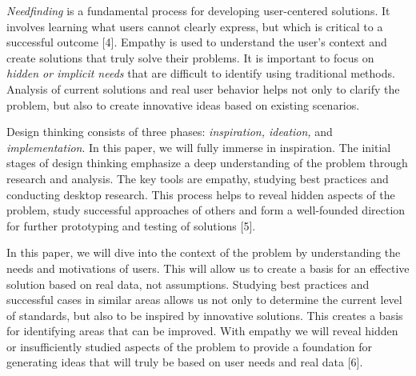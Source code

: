 \emph{Needfinding} is a fundamental process for developing user-centered
solutions. It involves learning what users cannot clearly express, but
which is critical to a successful outcome {[}4{]}. Empathy is used to
understand the user's context and create solutions that truly solve
their problems. It is important to focus on \emph{hidden or implicit
needs} that are difficult to identify using traditional methods.
Analysis of current solutions and real user behavior helps not only to
clarify the problem, but also to create innovative ideas based on
existing scenarios.

Design thinking consists of three phases: \emph{inspiration, ideation,}
and \emph{implementation}. In this paper, we will fully immerse in
inspiration. The initial stages of design thinking emphasize a deep
understanding of the problem through research and analysis. The key
tools are empathy, studying best practices and conducting desktop
research. This process helps to reveal hidden aspects of the problem,
study successful approaches of others and form a well-founded direction
for further prototyping and testing of solutions {[}5{]}.

In this paper, we will dive into the context of the problem by
understanding the needs and motivations of users. This will allow us to
create a basis for an effective solution based on real data, not
assumptions. Studying best practices and successful cases in similar
areas allows us not only to determine the current level of standards,
but also to be inspired by innovative solutions. This creates a basis
for identifying areas that can be improved. With empathy we will reveal
hidden or insufficiently studied aspects of the problem to provide a
foundation for generating ideas that will truly be based on user needs
and real data {[}6{]}.


